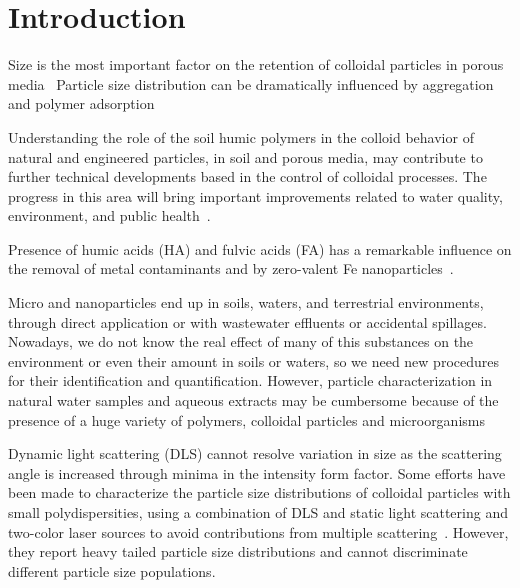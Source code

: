 \documentclass[journal=langd5,manuscript=article]{achemso}
\begin{document}
\section{Introduction}







Size is the most important factor on the retention of colloidal particles in porous media~\cite{Sirivithayapakorn2003,Sen2006}
Particle size distribution can be dramatically influenced by aggregation and polymer adsorption~\cite{Fang2009}


Understanding  the role of the soil humic polymers in the colloid behavior of natural and engineered particles, in soil and porous media, may contribute to further technical developments based in the control of colloidal processes. The progress in this area will bring important improvements related to water quality, environment, and public health~\cite{Ngo2008}\cite{Farre2011}.

Presence of humic acids (HA) and fulvic acids (FA) has a remarkable influence on the removal of metal contaminants 
  and   by zero-valent Fe nanoparticles~\cite{Mak2011234}.

Micro and nanoparticles end up in soils, waters, and  terrestrial environments, through direct application or with wastewater effluents or accidental spillages. Nowadays, we do not know the real effect of many of this substances on the environment or even their amount in soils or waters, so we need new procedures for their identification and quantification. However, particle characterization in natural water samples and aqueous extracts may be cumbersome because of the presence of a huge variety of polymers, colloidal particles and microorganisms~\cite{Ngo2008}


Dynamic light scattering (DLS)  cannot resolve variation in size as the scattering angle is increased through minima in the intensity form factor. Some efforts have been made to characterize the particle size distributions of colloidal particles with small polydispersities, using a combination of DLS and static light scattering and two-color laser sources to avoid contributions from multiple scattering~\cite{Bryant2003AccurateSuspensions}. However, they report heavy tailed particle size distributions and cannot discriminate different particle size populations.
\end{document}
